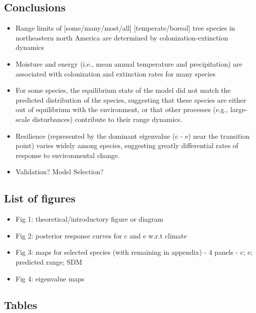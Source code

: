 \documentclass[11pt]{article}
\begin{document}

\subsection*{Conclusions}
\begin{itemize}
	\item Range limits of [some/many/most/all] [temperate/boreal] tree species in northeastern north America are determined by colonization-extinction dynamics
	\item Moisture and energy (i.e., mean annual temperature and precipitation) are associated with colonization and extinction rates for many species
	\item For some species, the equilibrium state of the model did not match the predicted distribution of the species, suggesting that these species are either out of equilibrium with the environment, or that other processes (e.g., large-scale disturbances) contribute to their range dynamics.
	\item Resilience (represented by the dominant eigenvalue (c - e) near the transition point) varies widely among species, suggesting greatly differential rates of response to environmental change.
	\item Validation? Model Selection?
\end{itemize}


\subsection*{List of figures}
\begin{itemize}
	\item Fig 1: theoretical/introductory figure or diagram
	\item Fig 2: posterior response curves for c and e w.r.t climate
	\item Fig 3: maps for selected species (with remaining in appendix) - 4 panels - c; e; predicted range; SDM
	\item Fig 4: eigenvalue maps
\end{itemize}

\subsection*{Tables}

\end{document}
